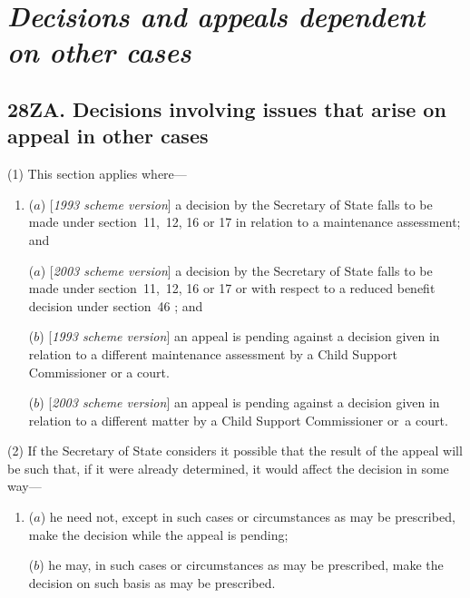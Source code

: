 \documentclass[12pt,a4paper]{article}
\begin{document}
\section[\itshape Decisions and appeals dependent on other cases]{\itshape\sloppy Decisions and appeals dependent on other cases}


\subsection{28ZA. Decisions involving issues that arise on appeal in other cases}

(1) This section applies where—
\begin{enumerate}\item[]
($a$) [\emph{1993 scheme version}] a decision by the Secretary of State falls to be made under section~11,~12, 16 or 17 in relation to a maintenance assessment; and

($a$) [\emph{2003 scheme version}] a decision by the Secretary of State falls to be made under section~11,~12, 16 or 17 
or with respect to a reduced benefit decision under section~46%
; and

($b$) [\emph{1993 scheme version}] an appeal is pending against a decision given in relation to a different maintenance assessment by a Child Support Commissioner or a court.

($b$) [\emph{2003 scheme version}] an appeal is pending against a decision given in relation to a different matter by a Child Support Commissioner or~a court.
\end{enumerate}

(2) If the Secretary of State considers it possible that the result of the appeal will be such that, if it were already determined, it would affect the decision in some way—
\begin{enumerate}\item[]
($a$) he need not, except in such cases or circumstances as may be prescribed, make the decision while the appeal is pending;

($b$) he may, in such cases or circumstances as may be prescribed, make the decision on such basis as may be prescribed.
\end{enumerate}
\end{document}
